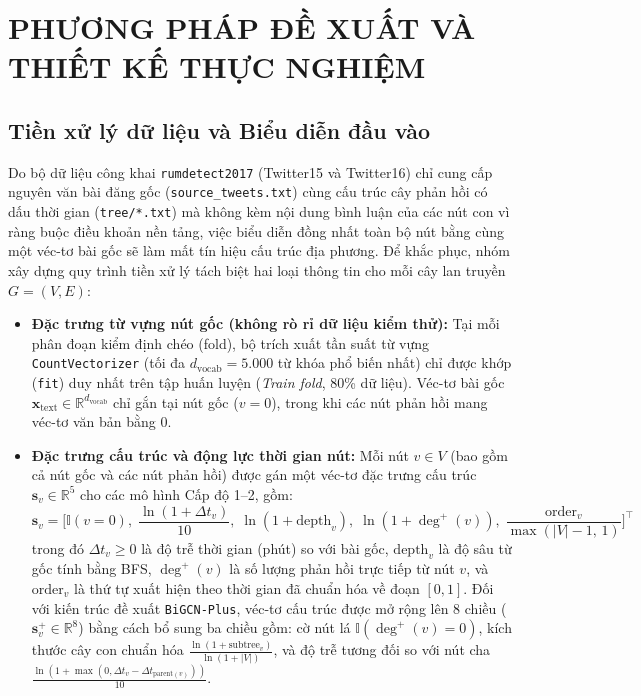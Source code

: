 \documentclass[11pt,a4paper]{extreport}
\begin{document}
\chapter{PHƯƠNG PHÁP ĐỀ XUẤT VÀ THIẾT KẾ THỰC NGHIỆM}

\section{Tiền xử lý dữ liệu và Biểu diễn đầu vào}

Do bộ dữ liệu công khai \texttt{rumdetect2017} (Twitter15 và Twitter16) \cite{ma_detect_2017} chỉ cung cấp nguyên văn bài đăng gốc (\texttt{source\_tweets.txt}) cùng cấu trúc cây phản hồi có dấu thời gian (\texttt{tree/*.txt}) mà không kèm nội dung bình luận của các nút con vì ràng buộc điều khoản nền tảng, việc biểu diễn đồng nhất toàn bộ nút bằng cùng một véc-tơ bài gốc sẽ làm mất tín hiệu cấu trúc địa phương. Để khắc phục, nhóm xây dựng quy trình tiền xử lý tách biệt hai loại thông tin cho mỗi cây lan truyền $G = (V, E)$:

\begin{itemize}
    \item \textbf{Đặc trưng từ vựng nút gốc (không rò rỉ dữ liệu kiểm thử):} Tại mỗi phân đoạn kiểm định chéo (fold), bộ trích xuất tần suất từ vựng \texttt{CountVectorizer} (tối đa $d_{\text{vocab}} = 5.000$ từ khóa phổ biến nhất) chỉ được khớp (\texttt{fit}) duy nhất trên tập huấn luyện (\textit{Train fold}, 80\% dữ liệu). Véc-tơ bài gốc $\mathbf{x}_{\text{text}} \in \mathbb{R}^{d_{\text{vocab}}}$ chỉ gắn tại nút gốc ($v = 0$), trong khi các nút phản hồi mang véc-tơ văn bản bằng $0$.
    \item \textbf{Đặc trưng cấu trúc và động lực thời gian nút:} Mỗi nút $v \in V$ (bao gồm cả nút gốc và các nút phản hồi) được gán một véc-tơ đặc trưng cấu trúc $\mathbf{s}_v \in \mathbb{R}^{5}$ cho các mô hình Cấp độ 1--2, gồm:
    \begin{equation}
        \mathbf{s}_v = \Big[\mathbb{I}(v=0),\; \frac{\ln(1+\Delta t_v)}{10},\; \ln(1+\text{depth}_v),\; \ln(1+\deg^+(v)),\; \frac{\text{order}_v}{\max(|V|-1,\,1)}\Big]^\top
        \label{eq:node-struct}
    \end{equation}
    trong đó $\Delta t_v \ge 0$ là độ trễ thời gian (phút) so với bài gốc, $\text{depth}_v$ là độ sâu từ gốc tính bằng BFS, $\deg^+(v)$ là số lượng phản hồi trực tiếp từ nút $v$, và $\text{order}_v$ là thứ tự xuất hiện theo thời gian đã chuẩn hóa về đoạn $[0, 1]$. Đối với kiến trúc đề xuất \texttt{BiGCN-Plus}, véc-tơ cấu trúc được mở rộng lên $8$ chiều ($\mathbf{s}_v^+ \in \mathbb{R}^8$) bằng cách bổ sung ba chiều gồm: cờ nút lá $\mathbb{I}(\deg^+(v)=0)$, kích thước cây con chuẩn hóa $\frac{\ln(1+\text{subtree}_v)}{\ln(1+|V|)}$, và độ trễ tương đối so với nút cha $\frac{\ln(1+\max(0, \Delta t_v - \Delta t_{\text{parent}(v)}))}{10}$.
\end{itemize}
\end{document}
